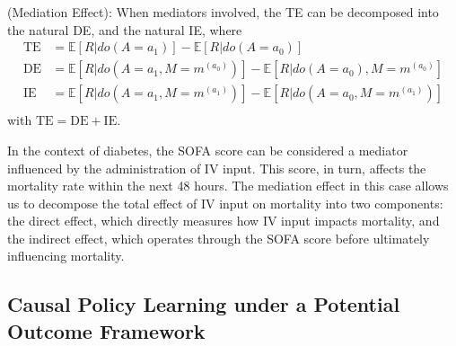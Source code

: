 \begin{definition} (Mediation Effect): When mediators involved, the \acrfull{TE} can be decomposed into the natural \acrfull{DE}, and the natural \acrfull{IE}, where
    \begin{equation*}
    \begin{aligned}
    \text{TE}&= \mathbb{E}[R|do(A=a_1)]-\mathbb{E}[R|do(A=a_0)]\\
    \text{DE}&= \mathbb{E}[R|do(A=a_1,M=m^{(a_0)})]-\mathbb{E}[R|do(A=a_0), M=m^{(a_0)}]\\
    \text{IE}&= \mathbb{E}[R|do(A=a_1,M=m^{(a_1)})]-\mathbb{E}[R|do(A=a_0,M=m^{(a_1)})]\\
    \end{aligned}
    \end{equation*}
with $\text{TE} = \text{DE}+ \text{IE}$. 
\end{definition}
In the context of diabetes, the \acrfull{SOFA} score can be considered a mediator influenced by the administration of IV input. This score, in turn, affects the mortality rate within the next 48 hours. The mediation effect in this case allows us to decompose the total effect of IV input on mortality into two components: the direct effect, which directly measures how IV input impacts mortality, and the indirect effect, which operates through the SOFA score before ultimately influencing mortality.



\subsection{Causal Policy Learning under a Potential Outcome Framework} \label{sec:p2_MDP}


